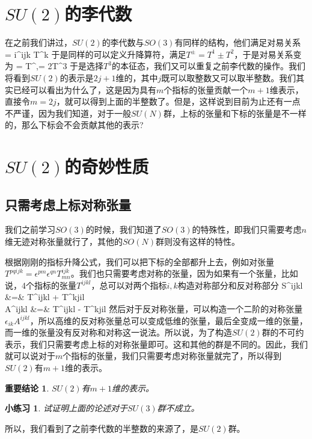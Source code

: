 \documentclass[11pt,a4paper]{ctexart}
\newtheorem{conclusion}{\hspace{2em} 重要结论}[section]
\newtheorem{practice}{\hspace{2em} 小练习}[section]
\begin{document}
\section{$SU(2)$的李代数}
在之前我们讲过，$SU(2)$的李代数与$SO(3)$有同样的结构，他们满足对易关系
\beq
\left[T^i,T^j\right] = i\epsilon^{ijk} T^k
\eeq
于是同样的可以定义升降算符，满足$T^\pm = T^1\pm T^2$，于是对易关系变为
\beq
\left[T^3, T^\pm\right] = \pm T^{\pm},\spa \left[ T^+,T^-\right] = 2T^3
\eeq
于是选择$T^3$的本征态，我们又可以重复之前李代数的操作。我们将看到$SU(2)$的表示是$2j+1$维的，其中$j$既可以取整数又可以取半整数。我们其实已经可以看出为什么了，这是因为具有$m$个指标的张量贡献一个$m+1$维表示，直接令$m=2j$，就可以得到上面的半整数了。但是，这样说到目前为止还有一点不严谨，因为我们知道，对于一般$SU(N)$群，上标的张量和下标的张量是不一样的，那么下标会不会贡献其他的表示?
\section{$SU(2)$的奇妙性质}
\subsection{只需考虑上标对称张量}
我们之前学习$SO(3)$的时候，我们知道了$SO(3)$的特殊性，即我们只需要考虑$n$维无迹对称张量就行了，其他的$SO(N)$群则没有这样的特性。

根据刚刚的指标升降公式，我们可以把下标的全部都升上去，例如对张量$T^{pqijk} = \epsilon ^{pm}\epsilon^{qn} T_{mn}^{ijk}$。我们也只需要考虑对称的张量，因为如果有一个张量，比如说，4个指标的张量$T^{ijkl}$，总可以对两个指标$i,k$构造对称部分和反对称部分
\bea
S^{ijkl} &=& T^{ijkl} + T^{kjil} \\
A^{ijkl} &=& T^{ijkl} - T^{kjil}
\eea
然后对于反对称张量，可以构造一个二阶的对称张量$\epsilon_{ik} A^{ijkl}$，所以高维的反对称张量总可以变成低维的张量，最后全变成一维的张量，而一维的张量没有反对称和对称这一说法。所以说，为了构造$SU(2)$群的不可约表示，我们只需要考虑上标的对称张量即可。这和其他的群是不同的。因此，我们就可以说对于$m$个指标的张量，我们只需要考虑对称张量就完了，所以得到$SU(2)$有$m+1$维的表示。
\begin{conclusion}
  $SU(2)$有$m+1$维的表示。
\end{conclusion}
\begin{practice}
  试证明上面的论述对于$SU(3)$群不成立。
\end{practice}
所以，我们看到了之前李代数的半整数的来源了，是$SU(2)$群。
\end{document}
